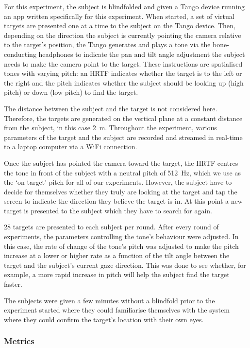 \documentclass[format=sigconf, review=true, screen=true, anonymous=true]{acmart}
\begin{document}
For this experiment, the subject is blindfolded and given a Tango device running an app written specifically for this experiment. When started, a set of virtual targets are presented one at a time to the subject on the Tango device. Then, depending on the direction the subject is currently pointing the camera relative to the target's position, the Tango generates and plays a tone via the bone-conducting headphones to indicate the pan and tilt angle adjustment the subject needs to make the camera point to the target. These instructions are spatialised tones with varying pitch: an HRTF indicates whether the target is to the left or the right and the pitch indicates whether the subject should be looking up (high pitch) or down (low pitch) to find the target. 

The distance between the subject and the target is not considered here. Therefore, the targets are generated on the vertical plane at a constant distance from the subject, in this case \SI{2}{\m}. Throughout the experiment, various parameters of the target and the subject are recorded and streamed in real-time to a laptop computer via a WiFi connection.

Once the subject has pointed the camera toward the target, the HRTF centres the tone in front of the subject with a neutral pitch of \SI{512}{\hertz}, which we use as the `on-target' pitch for all of our experiments.  However, the subject have to decide for themselves whether they truly are looking at the target and tap the screen to indicate the direction they believe the target is in. At this point a new target is presented to the subject which they have to search for again. 

28 targets are presented to each subject per round. After every round of experiments, the parameters controlling the tone's behaviour were adjusted. In this case, the rate of change of the tone's pitch was adjusted to make the pitch increase at a lower or higher rate as a function of the tilt angle between the target and the subject's current gaze direction. This was done to see whether, for example, a more rapid increase in pitch will help the subject find the target faster. 

The subjects were given a few minutes without a blindfold prior to the experiment started where they could familiarise themselves with the system where they could confirm the target's location with their own eyes.

\subsubsection{Metrics}
\end{document}
